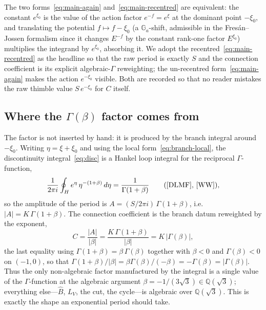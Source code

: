 \documentclass[11pt,reqno]{amsart}
\renewcommand{\_}{\vquadorigunderscore\allowbreak}
\theoremstyle{plain}
\theoremstyle{definition}
\newcommand{\Bhat}{\widehat{B}}
\newcommand{\LV}{L_{V}}
\newcommand{\Qsqrt}{\mathbb{Q}(\sqrt3)}
\newcommand{\xizero}{\xi_0}
\providecommand{\C}{}\renewcommand{\C}{C}
\begin{document}
The two forms~\eqref{eq:main-again} and~\eqref{eq:main-recentred} are equivalent: the constant
$e^{\xizero}$ is the value of the action factor $e^{-f}=e^{\xi}$ at the dominant point $-\xizero$,
and translating the potential $f\mapsto f-\xizero$ (a $\mathbb{G}_a$-shift, admissible in the
Fres\'an--Jossen formalism since it changes $E^{-f}$ by the constant rank-one factor
$E^{\xizero}$) multiplies the integrand by $e^{\xizero}$, absorbing it. We adopt the
recentred~\eqref{eq:main-recentred} as the headline so that the raw period is exactly $S$ and the
connection coefficient is its explicit algebraic-$\Gamma$ reweighting; the un-recentred
form~\eqref{eq:main-again} makes the action $e^{-\xizero}$ visible. Both are recorded so that no
reader mistakes the raw thimble value $S\,e^{-\xizero}$ for $\C$ itself.

\subsection{Where the \texorpdfstring{$\Gamma(\beta)$}{Gamma(beta)} factor comes from}
The factor is not inserted by hand: it is produced by the branch integral around $-\xizero$.
Writing $\eta=\xi+\xizero$ and using the local form~\eqref{eq:branch-local}, the discontinuity
integral~\eqref{eq:disc} is a Hankel loop integral for the reciprocal $\Gamma$-function,
\begin{equation}\label{eq:hankel-gamma}
  \frac{1}{2\pi i}\oint_{H}e^{\eta}\,\eta^{-(1+\beta)}\,d\eta=\frac{1}{\Gamma(1+\beta)}
  \qquad(\text{\cite[\S5.9]{DLMF}, \cite[\S12.22]{WW}}),
\end{equation}
so the amplitude of the period is $A=(S/2\pi i)\,\Gamma(1+\beta)$, i.e.
$\lvert A\rvert=K\,\Gamma(1+\beta)$. The connection coefficient is the branch datum reweighted by
the exponent,
\begin{equation}\label{eq:C-from-A}
  \C=\frac{\lvert A\rvert}{\lvert\beta\rvert}=\frac{K\,\Gamma(1+\beta)}{\lvert\beta\rvert}
   =K\,\lvert\Gamma(\beta)\rvert ,
\end{equation}
the last equality using $\Gamma(1+\beta)=\beta\,\Gamma(\beta)$ together with $\beta<0$ and
$\Gamma(\beta)<0$ on $(-1,0)$, so that $\Gamma(1+\beta)/\lvert\beta\rvert
=\beta\Gamma(\beta)/(-\beta)=-\Gamma(\beta)=\lvert\Gamma(\beta)\rvert$. Thus the only
non-algebraic factor manufactured by the
integral is a single value of the $\Gamma$-function at the algebraic argument
$\beta=-1/(3\sqrt3)\in\Qsqrt$; everything else---$\Bhat$, $\LV$, the cut, the cycle---is algebraic
over $\Qsqrt$. This is exactly the shape an exponential period should take.
\end{document}
